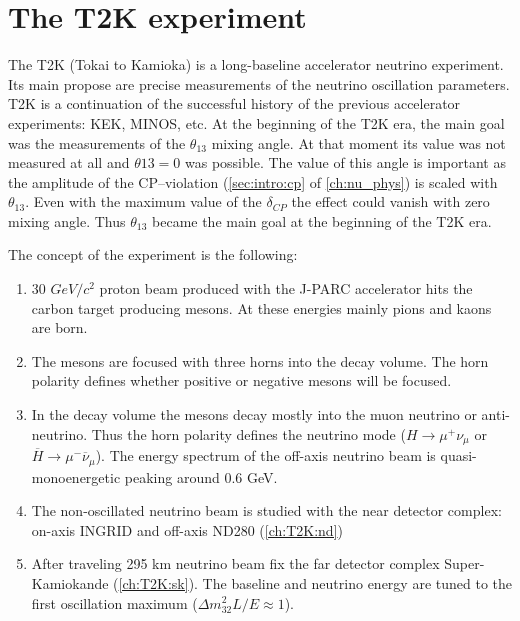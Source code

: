 \documentclass[../main.tex]{subfiles}
\begin{document}
\renewcommand{\labelitemi}{\ding{226}}
\renewcommand{\labelitemii}{\ding{227}}

\chapter{The T2K experiment}
\label{part:T2K:general}

The T2K (Tokai to Kamioka) is a long-baseline accelerator neutrino experiment. Its main propose are precise measurements of the neutrino oscillation parameters. T2K is a continuation of the successful history of the previous accelerator experiments: KEK, MINOS, etc. At the beginning of the T2K era, the main goal was the measurements of the $\theta_{13}$ mixing angle. At that moment its value was not measured at all and $\theta{13}=0$ was possible. The value of this angle is important as the amplitude of the CP--violation (\autoref{sec:intro:cp} of \autoref{ch:nu_phys}) is scaled with $\theta_{13}$. Even with the maximum value of the $\delta_{CP}$ the effect could vanish with zero mixing angle. Thus $\theta_{13}$ became the main goal at the beginning of the T2K era.

The concept of the experiment is the following:
\begin{enumerate}
  \item 30 $GeV/c^2$ proton beam produced with the J-PARC accelerator hits the carbon target producing mesons. At these energies mainly pions and kaons are born.
  \item The mesons are focused with three horns into the decay volume. The horn polarity defines whether positive or negative mesons will be focused.
  \item In the decay volume the mesons decay mostly into the muon neutrino or anti-neutrino. Thus the horn polarity defines the neutrino mode ($H\to\mu^+\nu_{\mu}$ or $\overline{H}\to\mu^-\overline{\nu}_{\mu}$). The energy spectrum of the off-axis neutrino beam is quasi-monoenergetic peaking around 0.6 GeV.
  \item The non-oscillated neutrino beam is studied with the near detector complex: on-axis INGRID and off-axis ND280 (\autoref{ch:T2K:nd})
  \item After traveling 295 km neutrino beam fix the far detector complex Super-Kamiokande (\autoref{ch:T2K:sk}). The baseline and neutrino energy are tuned to the first oscillation maximum ($\Delta m ^2_{32}L/E\approx1$).
\end{enumerate}
\end{document}
